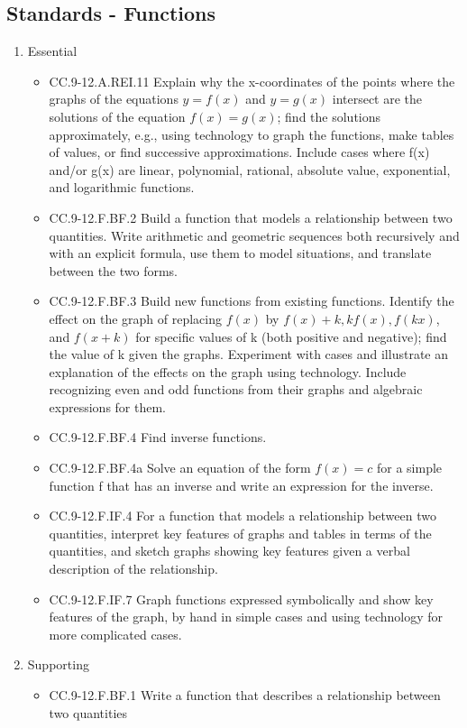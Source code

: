 \documentclass{article}
\begin{document}
\subsection*{Standards - Functions}
\begin{enumerate}
	\item Essential
	\begin{itemize}
		\item CC.9-12.A.REI.11  Explain why the x-coordinates of the points where the graphs of the equations $y = f(x)$ and $y = g(x)$ intersect are the solutions of the equation $f(x) = g(x)$; find the solutions approximately, e.g., using technology to graph the functions, make tables of values, or find successive approximations. Include cases where f(x) and/or g(x) are linear, polynomial, rational, absolute value, exponential, and logarithmic functions.
		\item CC.9-12.F.BF.2 Build a function that models a relationship between two quantities. Write arithmetic and geometric sequences both recursively and with an explicit formula, use them to model situations, and translate between the two forms.
		\item CC.9-12.F.BF.3 Build new functions from existing functions. Identify the effect on the graph of replacing $f(x)$ by $f(x) + k, k f(x), f(kx)$, and $f(x + k)$ for specific values of k (both positive and negative); find the value of k given the graphs. Experiment with cases and illustrate an explanation of the effects on the graph using technology. Include recognizing even and odd functions from their graphs and algebraic expressions for them.
		\item CC.9-12.F.BF.4  Find inverse functions. 
		\item CC.9-12.F.BF.4a Solve an equation of the form $f(x) = c$ for a simple function f that has an inverse and write an expression for the inverse. 
		\item CC.9-12.F.IF.4 For a function that models a relationship between two quantities, interpret key features of graphs and tables in terms of the quantities, and sketch graphs showing key features given a verbal description of the relationship. 
		\item CC.9-12.F.IF.7 Graph functions expressed symbolically and show key features of the graph, by hand in simple cases and using technology for more complicated cases.
	\end{itemize}		
	\item Supporting
	\begin{itemize}
		\item CC.9-12.F.BF.1 Write a function that describes a relationship between two quantities

\end{itemize}
\end{enumerate}
\end{document}
